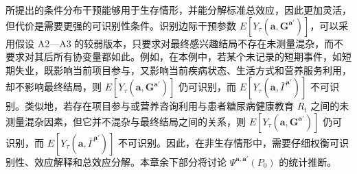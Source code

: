 所提出的条件分布干预能够用于生存情形，并能分解标准总效应，因此更加灵活，但代价是需要更强的可识别性条件。识别边际干预参数 $E[Y_\tau(\mathbf a,\mathbf G^{\mathbf a'})]$，可以采用假设 A2—A3 的较弱版本，只要求对最终感兴趣结局不存在未测量混杂，而不要求对其后所有协变量都如此。例如，在本例中，若某个未记录的短期事件，如短期失业，既影响当前项目参与，又影响当前疾病状态、生活方式和营养服务利用，却不影响最终结局，则 $E[Y_\tau(\mathbf a,\mathbf G^{\mathbf a'})]$ 仍可识别，而 $E[Y_\tau(\mathbf a,\bar\Gamma^{\mathbf a'})]$ 不可识别。类似地，若存在项目参与或营养咨询利用与患者糖尿病健康教育 $R_t$ 之间的未测量混杂因素，但它并不混杂与最终结局之间的关系，则 $E[Y_\tau(\mathbf a,\mathbf G^{\mathbf a'})]$ 仍可识别，而 $E[Y_\tau(\mathbf a,\bar\Gamma^{\mathbf a'})]$ 不可识别。因此，在非生存情形中，需要仔细权衡可识别性、效应解释和总效应分解。本章余下部分将讨论 $\Psi^{\mathbf a,\mathbf a'}(P_0)$ 的统计推断。
